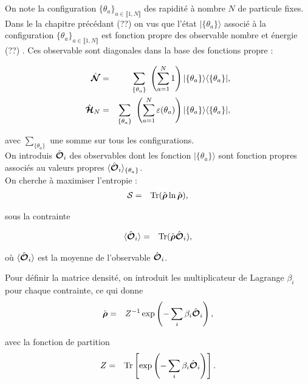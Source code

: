 On note la configuration $\{ \theta_a \}_{a\in \llbracket 1 , N \rrbracket}$ des rapidité à nombre $N$ de particule fixes. Dans le la chapitre précédant (??) on vus que l'état $\vert \{ \theta_a \} \rangle$ associé à la configuration $\{ \theta_a \}_{a\in \llbracket 1 , N \rrbracket}$ est fonction propre des observable nombre et énergie (??) . Ces observable sont diagonales dans la base des fonctions propre :

\begin{eqnarray}
	\operator{\mathcal{N}} & = & \sum_{ \{\theta_a\} }   \left ( \sum_{a = 1}^N  1 \right )  \vert \{ \theta_a\}\rangle	\langle \{ \theta_a \}\vert,\\
	\operator{\mathcal{H}}_N & = & \sum_{\{ \theta_a\}}  \left ( \sum_{a = 1}^N  \varepsilon ( \theta_a ) \right )   \vert \{ \theta_a\}\rangle	\langle \{ \theta_a \}\vert,		
\end{eqnarray}

avec $ \sum_{\{ \theta_a\}}$ une somme sur tous les configurations.\\

On introduis $\hat{\bm{\mathcal{O}}}_i$ des observables dont les fonction  $\vert \{ \theta_a \} \rangle$  sont fonction propres associés au valeurs propres $\langle \hat{\bm{\mathcal{O}}}_i \rangle_{\{\theta_a \}}$.\\

On cherche à maximiser l'entropie :
\begin{eqnarray}
	\mathcal{S} & = & \mathrm{Tr} ( \hat{\bm{\rho}} \ln \hat{\bm{\rho}} ) , 	
\end{eqnarray}

sous la contrainte 

\begin{eqnarray}
	\langle \hat{\bm{\mathcal{O}}}_i \rangle & = & 	\mathrm{Tr} ( \hat{\bm{\rho}} \hat{\bm{\mathcal{O}}}_i ) ,
\end{eqnarray}

où $\langle \hat{\bm{\mathcal{O}}}_i \rangle$ est la moyenne de l'observable $\hat{\bm{\mathcal{O}}}_i$.

Pour définir la matrice densité, on introduit les multiplicateur de Lagrange $\beta_i$ pour chaque contrainte, ce qui donne  
\begin{eqnarray}
	 \hat{\bm{\rho}} &= & Z^{-1} \exp \left ( - \sum_i \beta_i \hat{\bm{\mathcal{O}}}_i \right ) , 		
\end{eqnarray}

avec la fonction de partition 
\begin{eqnarray}
	Z & = & \mathrm{Tr} \left [ \exp \left ( - \sum_i \beta_i \hat{\bm{\mathcal{O}}}_i \right ) \right ]. 	
\end{eqnarray}

